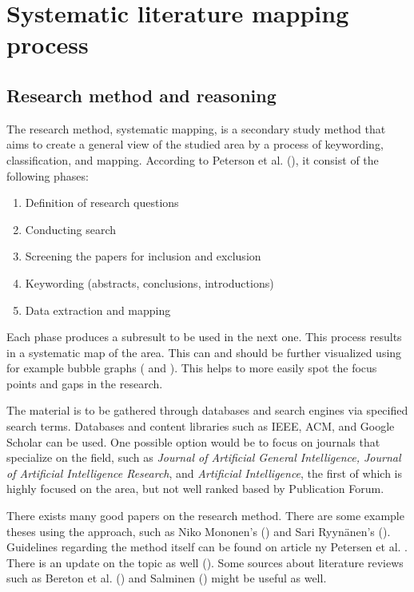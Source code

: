 \documentclass[utf8,english]{gradu3}
\begin{document}
\chapter{Systematic literature mapping process}

\section{Research method and reasoning}

\label{method}
The research method, systematic mapping, is a secondary study method that aims to create a general view of the studied area by a process of keywording, classification, and mapping. According to Peterson et al. (\cite*{petersen2008}), it consist of the following phases:
\begin{enumerate}
    \item Definition of research questions
    \item Conducting search
    \item Screening the papers for inclusion and exclusion
    \item Keywording (abstracts, conclusions, introductions)
    \item Data extraction and mapping
\end{enumerate}

Each phase produces a subresult to be used in the next one. This process results in a systematic map of the area. This can and should be further visualized using for example bubble graphs (\cite{mononen2018} and \cite{petersen2008}). This helps to more easily spot the focus points and gaps in the research.


The material is to be gathered through databases and search engines via specified search terms. Databases and content libraries such as IEEE, ACM, and Google Scholar can be used. One possible option would be to focus on journals that specialize on the field, such as \textit{Journal of Artificial General Intelligence, Journal of Artificial Intelligence Research}, and \textit{Artificial Intelligence}, the first of which is highly focused on the area, but not well ranked based by Publication Forum. 

There exists many good papers on the research method. There are some example theses using the approach, such as Niko Mononen's (\cite{mononen2018}) and Sari Ryynänen's (\cite{ryynanen2017}). Guidelines regarding the method itself can be found on article ny Petersen et al. \cite*{petersen2008}. There is an update on the topic as well (\cite{petersen2015}). Some sources about literature reviews such as Bereton et al. (\cite*{brereton2007}) and Salminen (\cite*{salminen2011}) might be useful as well.
\end{document}
